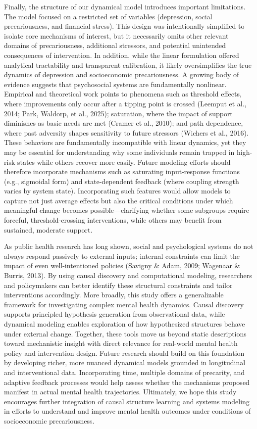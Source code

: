 \documentclass[
]{article}
\begin{document}
Finally, the structure of our dynamical model introduces important
limitations. The model focused on a restricted set of variables
(depression, social precariousness, and financial stress). This design
was intentionally simplified to isolate core mechanisms of interest, but
it necessarily omits other relevant domains of precariousness,
additional stressors, and potential unintended consequences of
intervention. In addition, while the linear formulation offered
analytical tractability and transparent calibration, it likely
oversimplifies the true dynamics of depression and socioeconomic
precariousness. A growing body of evidence suggests that psychosocial
systems are fundamentally nonlinear. Empirical and theoretical work
points to phenomena such as threshold effects, where improvements only
occur after a tipping point is crossed (Leemput et al., 2014; Park,
Waldorp, et al., 2025); saturation, where the impact of support
diminishes as basic needs are met (Cramer et al., 2010); and path
dependence, where past adversity shapes sensitivity to future stressors
(Wichers et al., 2016). These behaviors are fundamentally incompatible
with linear dynamics, yet they may be essential for understanding why
some individuals remain trapped in high-risk states while others recover
more easily. Future modeling efforts should therefore incorporate
mechanisms such as saturating input-response functions (e.g., sigmoidal
form) and state-dependent feedback (where coupling strength varies by
system state). Incorporating such features would allow models to capture
not just average effects but also the critical conditions under which
meaningful change becomes possible---clarifying whether some subgroups
require forceful, threshold-crossing interventions, while others may
benefit from sustained, moderate support.

As public health research has long shown, social and psychological
systems do not always respond passively to external inputs; internal
constraints can limit the impact of even well-intentioned policies
(Savigny \& Adam, 2009; Wagenaar \& Burris, 2013). By using causal
discovery and computational modeling, researchers and policymakers can
better identify these structural constraints and tailor interventions
accordingly. More broadly, this study offers a generalizable framework
for investigating complex mental health dynamics. Causal discovery
supports principled hypothesis generation from observational data, while
dynamical modeling enables exploration of how hypothesized structures
behave under external change. Together, these tools move us beyond
static descriptions toward mechanistic insight with direct relevance for
real-world mental health policy and intervention design. Future research
should build on this foundation by developing richer, more nuanced
dynamical models grounded in longitudinal and interventional data.
Incorporating time, multiple domains of precarity, and adaptive feedback
processes would help assess whether the mechanisms proposed manifest in
actual mental health trajectories. Ultimately, we hope this study
encourages further integration of causal structure learning and systems
modeling in efforts to understand and improve mental health outcomes
under conditions of socioeconomic precariousness.
\end{document}
